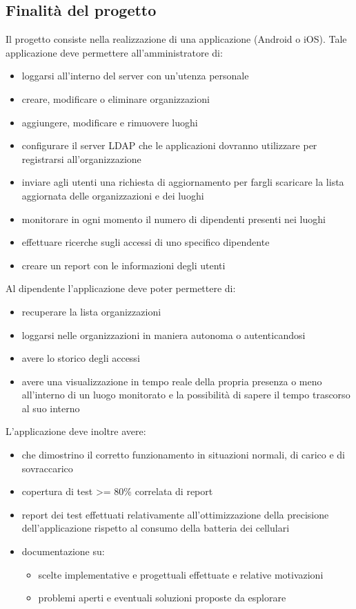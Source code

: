 \documentclass[../studio-di-fattibilita.tex]{subfiles}
\begin{document}
\subsection{Finalità del progetto}%
\label{finalita_del_progetto}
Il progetto consiste nella realizzazione di una applicazione (Android o iOS). Tale applicazione deve permettere all'amministratore di:
\begin{itemize}
  \item loggarsi all'interno del server con un'utenza personale
  \item creare, modificare o eliminare organizzazioni
  \item aggiungere, modificare e rimuovere luoghi
  \item configurare il server LDAP che le applicazioni dovranno utilizzare per registrarsi all'organizzazione
  \item inviare agli utenti una richiesta di aggiornamento per fargli scaricare la lista aggiornata delle organizzazioni e dei luoghi
  \item monitorare in ogni momento il numero di dipendenti presenti nei luoghi
  \item effettuare ricerche sugli accessi di uno specifico dipendente
  \item creare un report con le informazioni degli utenti
\end{itemize}
Al dipendente l'applicazione deve poter permettere di:
\begin{itemize}
  \item recuperare la lista organizzazioni
  \item loggarsi nelle organizzazioni in maniera autonoma o autenticandosi
  \item avere lo storico degli accessi
  \item avere una visualizzazione in tempo reale della propria presenza o meno all'interno di un luogo monitorato e la possibilità di sapere il tempo trascorso al suo interno
\end{itemize}
L'applicazione deve inoltre avere:
\begin{itemize}
  \item {} che dimostrino il corretto funzionamento in situazioni normali, di carico e di sovraccarico
  \item copertura di test >= 80\% correlata di report
  \item report dei test effettuati relativamente all'ottimizzazione della precisione dell'applicazione rispetto al consumo della batteria dei cellulari
  \item documentazione su:
  \begin{itemize}
    \item scelte implementative e progettuali effettuate e relative motivazioni
    \item problemi aperti e eventuali soluzioni proposte da esplorare
  \end{itemize}
\end{itemize}
\end{document}
